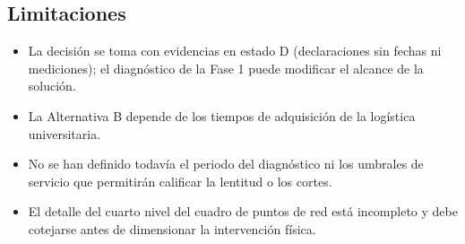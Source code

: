 \subsection{Limitaciones}

	\begin{itemize}
		\item La decisión se toma con evidencias en estado D (declaraciones sin fechas ni mediciones); el diagnóstico de la Fase 1 puede modificar el alcance de la solución.
		\item La Alternativa B depende de los tiempos de adquisición de la logística universitaria.
		\item No se han definido todavía el periodo del diagnóstico ni los umbrales de servicio que permitirán calificar la lentitud o los cortes.
		\item El detalle del cuarto nivel del cuadro de puntos de red está incompleto y debe cotejarse antes de dimensionar la intervención física.
	\end{itemize}
